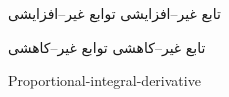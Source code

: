 { تابع غیر--افزایشی}{ توابع غیر--افزایشی}

{ تابع غیر--کاهشی}{ توابع غیر--کاهشی}

{Proportional-integral-derivative}